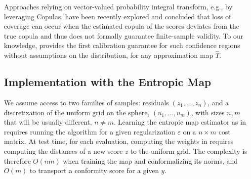 Approaches relying on vector-valued probability integral transform, e.g., by leveraging Copulas, have been recently explored 
\cite{messoudi2021copula, park2024semiparametric} and concluded that loss of coverage can occur when the estimated copula of the scores deviates from the true copula and thus does not
formally guarantee finite-sample validity. To our knowledge,  provides the first calibration guarantee for such confidence regions without assumptions on the distribution, for any approximation map $\hat T$.


























\subsection{Implementation with the Entropic Map}\label{subsec:entropic}

We assume access to two families of samples: residuals $(z_1,\dots ,z_n)$, and a discretization of the uniform grid on the sphere, $(u_1, \dots, u_m)$, with sizes $n,m$ that will be usually different, $n \ne m$.  Learning the entropic map estimator as in  requires running the \citet{Sinkhorn64} algorithm for a given regularization $\varepsilon$ on a $n\times m$ cost matrix. At test time, for each evaluation, computing the weights in  requires computing the distances of a new score $z$ to the uniform grid. The complexity is therefore $O(nm)$ when training the map and conformalizing its norms, and $O(m)$ to transport a conformity score for a given $y$. 

